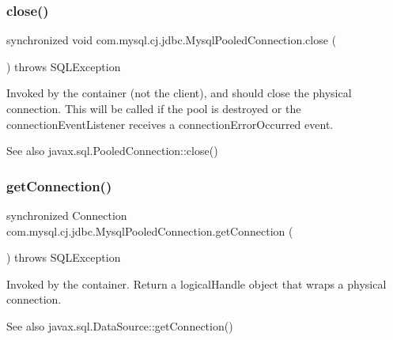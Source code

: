 \subsubsection{\texorpdfstring{close()}{close()}}
{\footnotesize\ttfamily synchronized void com.\+mysql.\+cj.\+jdbc.\+Mysql\+Pooled\+Connection.\+close (\begin{DoxyParamCaption}{ }\end{DoxyParamCaption}) throws S\+Q\+L\+Exception}

Invoked by the container (not the client), and should close the physical connection. This will be called if the pool is destroyed or the connection\+Event\+Listener receives a connection\+Error\+Occurred event.

\begin{DoxySeeAlso}{See also}
javax.\+sql.\+Pooled\+Connection\+::close() 
\end{DoxySeeAlso}
\mbox{\label{classcom_1_1mysql_1_1cj_1_1jdbc_1_1_mysql_pooled_connection_a0aa675b4e16ec148099680b9651d90e7}} 
\subsubsection{\texorpdfstring{get\+Connection()}{getConnection()}}
{\footnotesize\ttfamily synchronized Connection com.\+mysql.\+cj.\+jdbc.\+Mysql\+Pooled\+Connection.\+get\+Connection (\begin{DoxyParamCaption}{ }\end{DoxyParamCaption}) throws S\+Q\+L\+Exception}

Invoked by the container. Return a logical\+Handle object that wraps a physical connection.

\begin{DoxySeeAlso}{See also}
javax.\+sql.\+Data\+Source\+::get\+Connection() 
\end{DoxySeeAlso}
\mbox{\label{classcom_1_1mysql_1_1cj_1_1jdbc_1_1_mysql_pooled_connection_a04e5a3da33510961ae371ab051926e9f}} 
